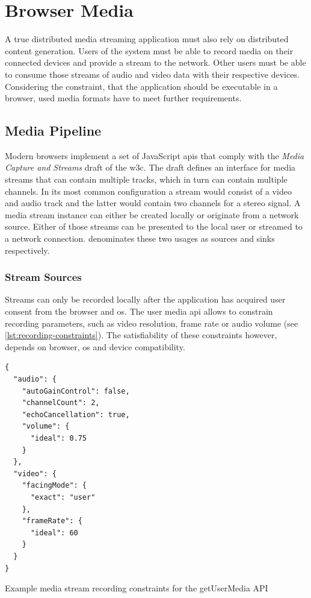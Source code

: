 \section{Browser Media}

A true distributed media streaming application must also rely on distributed content generation. Users of the system must be able to record media on their connected devices and provide a stream to the network. Other users must be able to consume those streams of audio and video data with their respective devices. Considering the constraint, that the application should be executable in a browser, used media formats have to meet further requirements.

\subsection{Media Pipeline}
\label{browser-api}

Modern browsers implement a set of JavaScript \glspl{api} that comply with the {\textit{Media Capture and Streams}} draft \cite{media-capture-and-streams} of the \gls{w3c}. The draft defines an interface for media streams that can contain multiple tracks, which in turn can contain multiple channels. In its most common configuration a stream would consist of a video and audio track and the latter would contain two channels for a stereo signal. A media stream instance can either be created locally or originate from a network source. Either of those streams can be presented to the local user or streamed to a network connection. \cite{media-capture-and-streams} denominates these two usages as sources and sinks respectively.

\subsubsection{Stream Sources}

Streams can only be recorded locally after the application has acquired user consent from the browser and \gls{os}. The user media \gls{api} allows to constrain recording parameters, such as video resolution, frame rate or audio volume (see \ref{lst:recording-constraints}). The satisfiability of these constraints however, depends on browser, \gls{os} and device compatibility.

\begin{Listing}
\begin{lstlisting}
{
  "audio": {
    "autoGainControl": false,
    "channelCount": 2,
    "echoCancellation": true,
    "volume": {
      "ideal": 0.75
    }
  },
  "video": {
    "facingMode": {
      "exact": "user"
    },
    "frameRate": {
      "ideal": 60
    }
  }
}
\end{lstlisting}
\caption{Example media stream recording constraints for the getUserMedia API}
\label{lst:recording-constraints}
\end{Listing}

